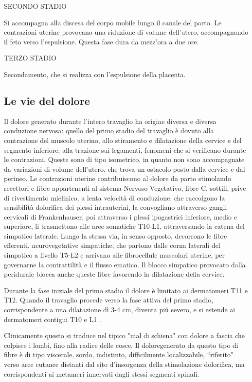 \documentclass[]{article}
\begin{document}
SECONDO STADIO

Si accompagna alla discesa del corpo mobile lungo il canale del parto.
Le contrazioni uterine provocano una riduzione di volume dell'utero,
accompagnando il feto verso l'espulsione. Questa fase dura da mezz'ora a
due ore.

TERZO STADIO

Secondamento, che si realizza con l'espulsione della placenta.

\hypertarget{le-vie-del-dolore}{%
\subsection{Le vie del dolore}\label{le-vie-del-dolore}}

Il dolore generato durante l'intero travaglio ha origine diversa e
diversa conduzione nervosa: quello del primo stadio del travaglio è
dovuto alla contrazione del muscolo uterino, allo stiramento e
dilatazione della cervice e del segmento inferiore, alla trazione sui
legamenti, fenomeni che si verificano durante le contrazioni. Queste
sono di tipo isometrico, in quanto non sono accompagnate da variazioni
di volume dell'utero, che trova un ostacolo posto dalla cervice e dal
perineo. Le contrazioni uterine contribuiscono al dolore da parto
stimolando recettori e fibre appartenenti al sistema Nervoso Vegetativo,
fibre C, sottili, prive di rivestimento mielinico, a lenta velocità di
conduzione, che raccolgono la sensibilità dolorifica dei plessi
intrauterini, la convogliano attraverso gangli cervicali di
Frankenhauser, poi attraverso i plessi ipogastrici inferiore, medio e
superiore, li trasmettono alle aree somatiche T10-L1, attraversando la
catena del simpatico laterale. Lungo la stessa via, in senso opposto,
decorrono le fibre efferenti, neurovegetative simpatiche, che partono
dalle corna laterali del simpatico a livello T5-L2 e arrivano alle
fibrocellule muscolari uterine, per governarne la contrattilità e il
flusso ematico. Il blocco simpatico provocato dalla peridurale blocca
anche queste fibre favorendo la dilatazione della cervice.

Durante la fase iniziale del primo stadio il dolore è limitato ai
dermatomeri T11 e T12. Quando il travaglio procede verso la fase attiva
del primo stadio, corrispondente a una dilatazione dì 3-4 cm, diventa
più severo, e si estende ai dermatomeri contigui T10 e L1 .

Clinicamente questo si traduce nel tipico "mal di schiena" con dolore a
fascia che colpisce i lombi, fino alla radice delle cosce. Il
doloregenerato da questo tipo di fibre è di tipo viscerale, sordo,
indistinto, difficilmente localizzabile, ``riferito" verso aree cutanee
distanti dal sito d'insorgenza della stimolazione dolorifica, ma
corrispondenti ai metameri innervati dagli stessi segmenti spinali.
\end{document}
